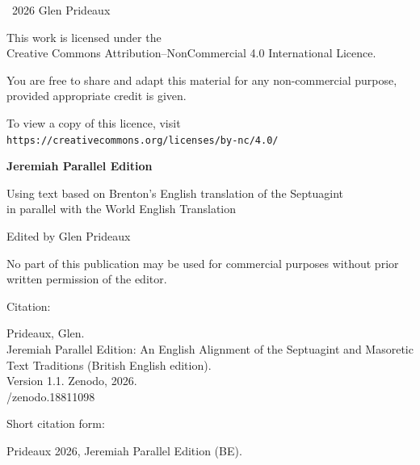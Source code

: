 \clearpage
\thispagestyle{empty}
\vspace*{\fill}

\small
\textcopyright\ 2026 Glen Prideaux

\vspace{1em}

This work is licensed under the\\
Creative Commons Attribution–NonCommercial 4.0 International Licence.

\vspace{1em}

You are free to share and adapt this material for any non-commercial purpose,
provided appropriate credit is given.

\vspace{1em}

To view a copy of this licence, visit\\
\texttt{https://creativecommons.org/licenses/by-nc/4.0/}

\vspace{2em}

\textbf{Jeremiah Parallel Edition}

Using text based on Brenton's English translation of the Septuagint\\
in parallel with the World English Translation

\vspace{1em}

Edited by Glen Prideaux

\vspace{2em}

No part of this publication may be used for commercial purposes
without prior written permission of the editor.

\vspace{2em}

{
\setlength{\parindent}{1cm}%
\noindent Citation:\par
\indent Prideaux, Glen.\\
\indent Jeremiah Parallel Edition: An English Alignment of the
Septuagint and Masoretic Text Traditions (British English edition).\\
\indent Version 1.1. Zenodo, 2026.\\
/zenodo.18811098

\noindent Short citation form:\par
\indent Prideaux 2026, Jeremiah Parallel Edition (BE).
}

\vspace{2em}

